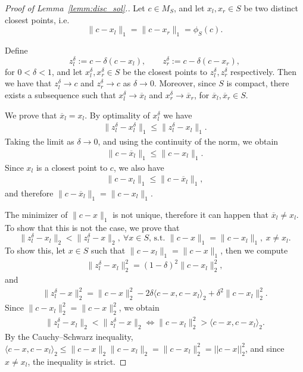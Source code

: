 \documentclass[pdflatex]{sn-jnl}%
\begin{document}
\begin{proof}[Proof of Lemma~\ref{lemm:disc_sol}.]
Let $c \in M_S$, and let $x_l, x_r \in S$ be two distinct closest points, i.e.
\[
\|c - x_l\|_1 = \|c - x_r\|_1 = \phi_S(c).
\]

Define
\[
z_l^\delta := c - \delta (c - x_l), 
\qquad 
z_r^\delta := c - \delta (c - x_r),
\]
for $0 < \delta < 1$, and let $x_l^\delta, x_r^\delta \in S$ be the closest points to $z_l^\delta, z_r^\delta$ respectively. Then we have that $z_l^\delta\to c$ and $z_r^\delta\to c$ as $\delta \to 0$. Moreover, since $S$ is compact, there exists a subsequence such that $x_l^\delta\to \overline{x}_l$ and $x_r^\delta \to\overline{x}_r$, for $\overline{x}_l,\overline{x}_r\in S$.

We prove that $\overline{x}_l=x_l$. By optimality of $x_l^\delta$ we have
\begin{align}
    \|z_l^\delta-x_l^\delta\|_1 \leq \|z_l^\delta-x_l\|_1.
\end{align}
Taking the limit as $\delta\to 0$, and using the continuity of the norm, we obtain
\begin{align}
    \|c-\overline{x}_l\|_1 \leq \|c-x_l\|_1.
\end{align}
Since $x_l$ is a closest point to $c$, we also have
\begin{align}
    \|c-x_l\|_1 \leq \|c-\overline{x}_l\|_1,
\end{align}
and therefore $\|c-\overline{x}_l\|_1 = \|c-x_l\|_1$.

The minimizer of $\|c-x\|_1$ is not unique, therefore it can happen that $\overline{x}_l\neq x_l$. To show that this is not the case, we prove that 
\begin{equation}
    \|z_l^\delta -x_l\|_2<\|z_l^\delta-x\|_2,\ \forall x\in S\textrm{, s.t. }\|c-x\|_1 = \|c-x_l\|_1,\ x\neq x_l.
\end{equation}
To show this, let $x\in S$ such that $\|c-x_l\|_1=\|c-x\|_1$, then we compute 
\begin{align}
    \|z_l^\delta -x_l\|_2^2 = (1-\delta)^2\|c-x_l\|_2^2,
\end{align}
and
\begin{align}
    \|z_l^\delta-x\|_2^2= \|c-x\|_2^2-2\delta \langle c-x,c-x_l\rangle_2+\delta^2\|c-x_l\|_2^2.
\end{align}
Since $\|c-x_l\|_2^2 = \|c-x\|_2^2$, we obtain
\begin{align*}
    \|z_l^\delta -x_l\|_2<\|z_l^\delta-x\|_2
    \iff \|c-x_l\|_2^2 > \langle c-x,c-x_l\rangle_2.
\end{align*}
By the Cauchy--Schwarz inequality, $\langle c-x,c-x_l\rangle_2 \leq \|c-x\|_2\|c-x_l\|_2 = \|c-x_l\|_2^2 = ||c-x||_2^2$, and since $x\neq x_l$, the inequality is strict. 


\end{proof}
\end{document}
